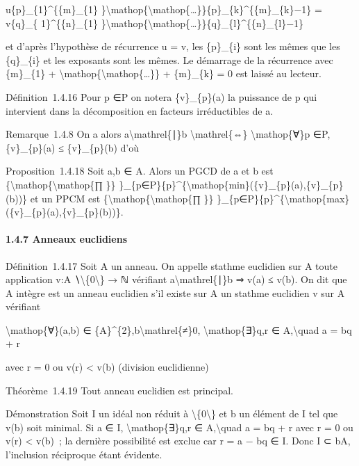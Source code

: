 \documentclass[]{article}
\begin{document}
u\{p\}\_\{1\}\^{}\{\{m\}\_\{1\}
\}\textbackslash{}mathop\{\textbackslash{}mathop\{\ldots{}\}\}\{p\}\_\{k\}\^{}\{\{m\}\_\{k\}−1\}
= v\{q\}\_\{ 1\}\^{}\{\{n\}\_\{1\}
\}\textbackslash{}mathop\{\textbackslash{}mathop\{\ldots{}\}\}\{q\}\_\{l\}\^{}\{\{n\}\_\{l\}−1\}

et d'après l'hypothèse de récurrence u = v, les \{p\}\_\{i\} sont les
mêmes que les \{q\}\_\{i\} et les exposants sont les mêmes. Le démarrage
de la récurrence avec \{m\}\_\{1\} +
\textbackslash{}mathop\{\textbackslash{}mathop\{\ldots{}\}\} +
\{m\}\_\{k\} = 0 est laissé au lecteur.

Définition~1.4.16 Pour p ∈P on notera \{v\}\_\{p\}(a) la puissance de p
qui intervient dans la décomposition en facteurs irréductibles de a.

Remarque~1.4.8 On a alors a\textbackslash{}mathrel\{∣\}b
\textbackslash{}mathrel\{⇔\} \textbackslash{}mathop\{∀\}p ∈P,
\{v\}\_\{p\}(a) ≤ \{v\}\_\{p\}(b) d'où

Proposition~1.4.18 Soit a,b ∈ A. Alors un PGCD de a et b est
\{\textbackslash{}mathop\{\textbackslash{}mathop\{∏ \}\}
\}\_\{p∈P\}\{p\}\^{}\{\textbackslash{}mathop\{min\}(\{v\}\_\{p\}(a),\{v\}\_\{p\}(b))\}
et un PPCM est \{\textbackslash{}mathop\{\textbackslash{}mathop\{∏ \}\}
\}\_\{p∈P\}\{p\}\^{}\{\textbackslash{}mathop\{max\}(\{v\}\_\{p\}(a),\{v\}\_\{p\}(b))\}.

\paragraph{1.4.7 Anneaux euclidiens}

Définition~1.4.17 Soit A un anneau. On appelle stathme euclidien sur A
toute application v:A ∖\textbackslash{}\{0\textbackslash{}\} → ℕ
vérifiant a\textbackslash{}mathrel\{∣\}b ⇒ v(a) ≤ v(b). On dit que A
intègre est un anneau euclidien s'il existe sur A un stathme euclidien v
sur A vérifiant

\textbackslash{}mathop\{∀\}(a,b) ∈
\{A\}\^{}\{2\},b\textbackslash{}mathrel\{≠\}0,
\textbackslash{}mathop\{∃\}q,r ∈ A,\textbackslash{}quad a = bq + r

avec r = 0 ou v(r) \textless{} v(b) (division euclidienne)

Théorème~1.4.19 Tout anneau euclidien est principal.

Démonstration Soit I un idéal non réduit à
\textbackslash{}\{0\textbackslash{}\} et b un élément de I tel que v(b)
soit minimal. Si a ∈ I, \textbackslash{}mathop\{∃\}q,r ∈
A,\textbackslash{}quad a = bq + r avec r = 0 ou v(r) \textless{} v(b)~;
la dernière possibilité est exclue car r = a − bq ∈ I. Donc I ⊂ bA,
l'inclusion réciproque étant évidente.
\end{document}
